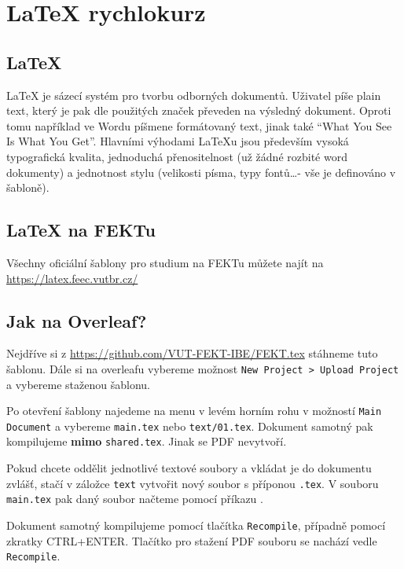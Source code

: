 \section{LaTeX rychlokurz}
\subsection{\LaTeX}
LaTeX je sázecí systém pro tvorbu odborných dokumentů.
Uživatel píše plain text, který je pak dle použitých značek převeden na výsledný dokument.
Oproti tomu například ve Wordu píšmene formátovaný text, jinak také \enquote{What You See Is What You Get}.
Hlavními výhodami LaTeXu jsou především vysoká typografická kvalita, jednoduchá přenositelnost (už žádné rozbité word dokumenty) a jednotnost stylu (velikosti písma, typy fontů\dots - vše je definováno v šabloně).

\subsection{LaTeX na FEKTu}

Všechny oficiální šablony pro studium na FEKTu můžete najít na 
\url{https://latex.feec.vutbr.cz/}

\subsection{Jak na Overleaf?}

Nejdříve si z \url{https://github.com/VUT-FEKT-IBE/FEKT.tex}
stáhneme tuto šablonu.
Dále si na overleafu vybereme možnost \texttt{New Project > Upload Project} a vybereme staženou šablonu.

Po otevření šablony najedeme na menu v levém horním rohu v možností \texttt{Main Document} a vybereme \texttt{main.tex} nebo \texttt{text/01.tex}.
Dokument samotný pak kompilujeme \textbf{mimo} \texttt{shared.tex}.
Jinak se PDF nevytvoří.

Pokud chcete oddělit jednotlivé textové soubory a vkládat je do dokumentu zvlášť, stačí v záložce \texttt{text} vytvořit nový soubor s příponou \texttt{.tex}.
V souboru \texttt{main.tex} pak daný soubor načteme pomocí příkazu \verb||.

Dokument samotný kompilujeme pomocí tlačítka \texttt{Recompile}, případně pomocí zkratky CTRL+ENTER.
Tlačítko pro stažení PDF souboru se nachází vedle \texttt{Recompile}.



